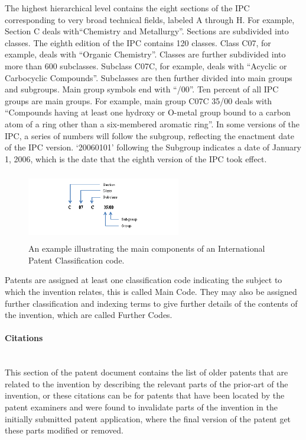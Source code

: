 The highest hierarchical level contains the eight sections of the IPC corresponding
to very broad technical fields, labeled A through H. For example, Section C deals
with``Chemistry and Metallurgy''. Sections are subdivided into classes. The eighth edition of the IPC contains 120
classes. Class C07, for example, deals with ``Organic Chemistry''. Classes are further subdivided into more than 600 subclasses. Subclass C07C, for example, deals with ``Acyclic or Carbocyclic Compounds''. Subclasses are then further divided into main groups and subgroups. Main group symbols end with ``/00''. Ten percent of all IPC groups are main
groups. For example, main group C07C 35/00 deals with ``Compounds having at
least one hydroxy or O-metal group bound to a carbon atom of a ring other than
a six-membered aromatic ring''. In some versions of the IPC, a series of numbers will follow the subgroup, reflecting
the enactment date of the IPC version. `20060101' following the Subgroup
indicates a date of January 1, 2006, which is the date that the eighth version of
the IPC took effect. 
\begin{figure}[t!]
   \centering
   \includegraphics[width=0.60\textwidth,height=30mm]{figs/IPCexample.jpg}
   \caption{An example illustrating the main components of an International Patent Classification code.}   
   \label{fig:ipcexample} 
\end{figure}

Patents are assigned at least one classification code 
indicating the subject to which the invention relates, this is called Main Code. They may also be assigned further classification and 
indexing terms to give further details of the contents of the invention, which are called Further Codes. 

\paragraph{Citations}
\ \\ 
This section of the patent document contains the list of older patents that are related to the
invention by describing the relevant parts of the prior-art of the invention, or these citations can
be for patents that have been located by the patent examiners and were found to invalidate parts 
of the invention in the initially submitted patent application, where the final version of the patent
get these parts modified or removed.
